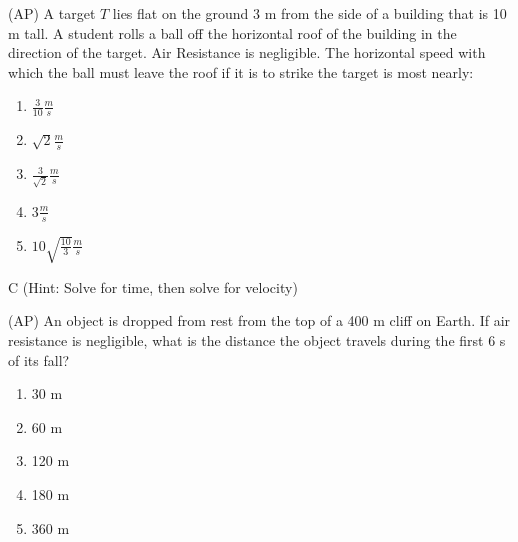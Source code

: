 
\begin{question}
(AP) A target $T$ lies flat on the ground 3 m from the side of a building that  is 10 m tall. A student rolls a ball off the horizontal roof of the building in the direction of the target. Air Resistance is negligible. The horizontal speed with which the ball must leave the roof if it is to strike the target is most nearly:

\begin{multicols}{5}
\begin{enumerate}[label=(\alph*)]
    \item $\frac{3}{10}\frac{m}{s}$
    \item $\sqrt{2}\frac{m}{s}$
    \item $\frac{3}{\sqrt{2}}\frac{m}{s}$
    \item $3\frac{m}{s}$
    \item $10\sqrt{\frac{10}{3}}\frac{m}{s}$
\end{enumerate}
\end{multicols}

\end{question}

\begin{solution}
C (Hint: Solve for time, then solve for velocity)
\end{solution}


\begin{question}
(AP) An object is dropped from rest from the top of a 400 m cliff on Earth. If air resistance is negligible, what is the distance the object travels during the first 6 s of its fall?

\begin{multicols}{5}
\begin{enumerate}[label=(\alph*)]
    \item 30 m
    \item 60 m
    \item 120 m
    \item 180 m
    \item 360 m
\end{enumerate}
\end{multicols}

\end{question}


